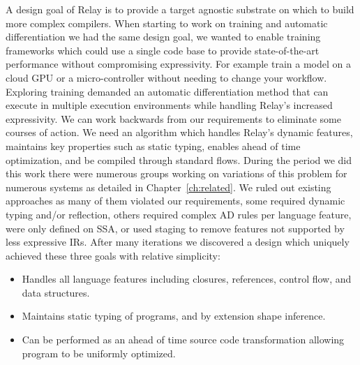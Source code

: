 A design goal of Relay is to provide a target agnostic substrate on which
  to build more complex compilers.
When starting to work on training and automatic differentiation we had
  the same design goal, we wanted to enable training frameworks which
  could use a single code base to provide state-of-the-art performance
  without compromising expressivity.
For example train a model on a cloud GPU or a micro-controller without
  needing to change your workflow.
Exploring training demanded an automatic differentiation method that can
  execute in multiple execution environments while handling Relay's increased
  expressivity.
We can work backwards from our requirements to eliminate some courses
  of action.
We need an algorithm which handles Relay's dynamic features, maintains
  key properties such as static typing, enables ahead of time optimization,
  and be compiled through standard flows.
During the period we did this work there were numerous
  groups working on variations of this problem for numerous systems
  as detailed in Chapter~\ref{ch:related}.
We ruled out existing approaches
  as many of them violated our requirements, some required dynamic typing
  and/or reflection, others required complex AD rules per language feature,
  were only defined on SSA, or used staging to remove features not supported
  by less expressive IRs.
After many iterations we discovered a design which uniquely achieved these
  three goals with relative simplicity:
\begin{itemize}
  \item Handles all language features including closures,
        references, control flow, and data structures.
  \item Maintains static typing of programs, and by extension shape inference.
  \item Can be performed as an ahead of time source code
    transformation allowing program to be uniformly optimized.
\end{itemize}


